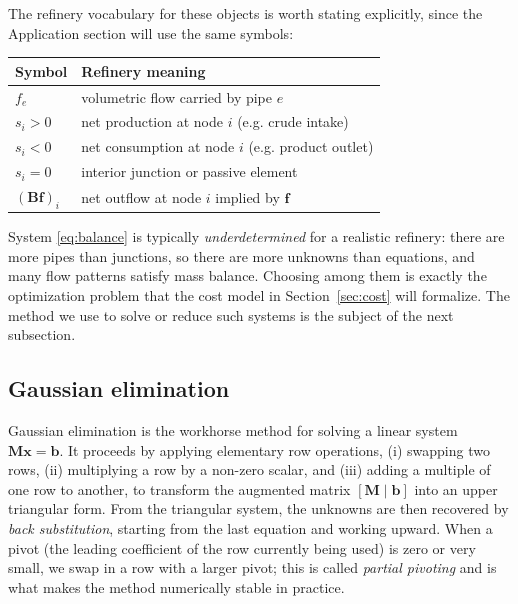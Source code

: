 \documentclass[11pt,a4paper]{article}
\newcommand{\mat}[1]{\mathbf{#1}}
\newcommand{\vect}[1]{\mathbf{#1}}
\begin{document}
The refinery vocabulary for these objects is worth stating explicitly,
since the Application section will use the same symbols:
\begin{center}
\begin{tabular}{@{}ll@{}}
\toprule
Symbol & Refinery meaning \\
\midrule
$f_e$        & volumetric flow carried by pipe $e$ \\
$s_i > 0$    & net production at node $i$ (e.g. crude intake) \\
$s_i < 0$    & net consumption at node $i$ (e.g. product outlet) \\
$s_i = 0$    & interior junction or passive element \\
$(\mat{B}\vect{f})_i$ & net outflow at node $i$ implied by $\vect{f}$ \\
\bottomrule
\end{tabular}
\end{center}

System \eqref{eq:balance} is typically \emph{underdetermined} for a
realistic refinery: there are more pipes than junctions, so there are
more unknowns than equations, and many flow patterns satisfy mass
balance. Choosing among them is exactly the optimization problem that
the cost model in Section~\ref{sec:cost} will formalize. The method
we use to solve or reduce such systems is the subject of the next
subsection.

\subsection{Gaussian elimination}
\label{sec:gauss}

Gaussian elimination is the workhorse method for solving a linear
system $\mat{M}\vect{x} = \vect{b}$. It proceeds by applying elementary
row operations, (i) swapping two rows, (ii) multiplying a row by a
non-zero scalar, and (iii) adding a multiple of one row to another, to
transform the augmented matrix $[\mat{M} \mid \vect{b}]$ into an upper
triangular form. From the triangular system, the unknowns are then
recovered by \emph{back substitution}, starting from the last equation
and working upward. When a pivot (the leading coefficient of the row
currently being used) is zero or very small, we swap in a row with a
larger pivot; this is called \emph{partial pivoting} and is what makes
the method numerically stable in practice.
\end{document}
